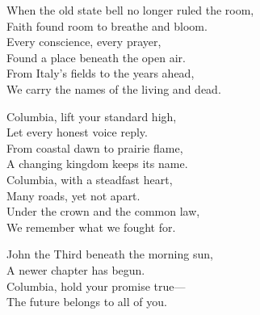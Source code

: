 \begin{lyrics}
When the old state bell no longer ruled the room,\\
Faith found room to breathe and bloom.\\
Every conscience, every prayer,\\
Found a place beneath the open air.\\
From Italy's fields to the years ahead,\\
We carry the names of the living and dead.

Columbia, lift your standard high,\\
Let every honest voice reply.\\
From coastal dawn to prairie flame,\\
A changing kingdom keeps its name.\\
Columbia, with a steadfast heart,\\
Many roads, yet not apart.\\
Under the crown and the common law,\\
We remember what we fought for.

John the Third beneath the morning sun,\\
A newer chapter has begun.\\
Columbia, hold your promise true—\\
The future belongs to all of you.
\end{lyrics}

